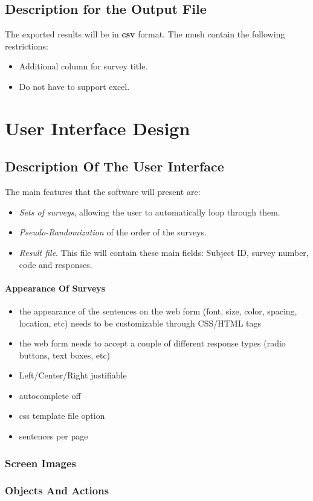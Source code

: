 \documentclass[a4paper,12pt,oneside]{report}
\begin{document}
\section{Description for the Output File}
The exported results will be in {\bf csv} format. The mush contain the following restrictions:
\begin {itemize}
\item Additional column for survey title.
 \item Do not have to support excel.
\end{itemize}


\chapter{ User Interface Design}

\section{  Description Of The User Interface}

The main features that the software will present are:
\begin{itemize}
\item {\it Sets of surveys}, allowing the user to automatically loop through them.
\item {\it Pseudo-Randomization} of the order of the surveys.
\item {\it Result file}. This file will contain these main fields: Subject ID, survey number, code and responses.
\end{itemize}

\subsubsection { Appearance Of Surveys}
\begin{itemize} 
	\item  the appearance of the sentences on the web form (font, size, color, spacing, location, etc) needs to be customizable through CSS/HTML tags
	\item the web form needs to accept a couple of different response types (radio buttons, text boxes, etc)
	\item Left/Center/Right justifiable
	\item autocomplete off
	\item css template file option
	\item sentences per page
\end{itemize}

\subsection{ Screen Images}
\subsection{ Objects And Actions}
\end{document}

